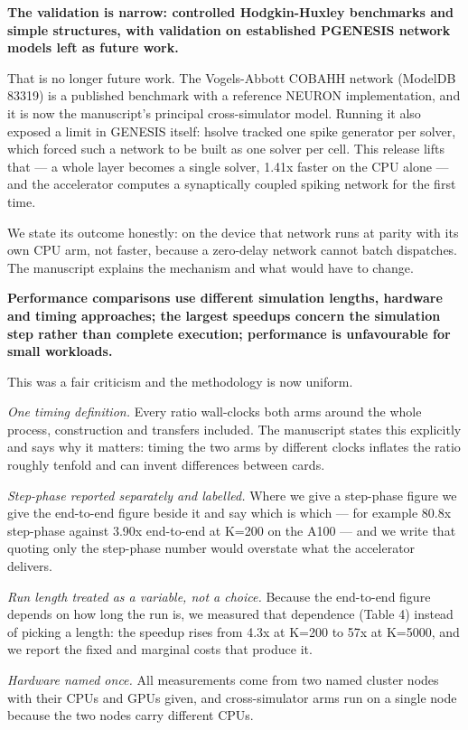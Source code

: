 \documentclass[11pt,a4paper]{article}
\begin{document}
\textbf{The validation is narrow: controlled Hodgkin-Huxley benchmarks and simple structures, with validation on established PGENESIS network models left as future work.}

That is no longer future work. The Vogels-Abbott COBAHH network (ModelDB 83319) is a published benchmark with a reference NEURON implementation, and it is now the manuscript's principal cross-simulator model. Running it also exposed a limit in GENESIS itself: hsolve tracked one spike generator per solver, which forced such a network to be built as one solver per cell. This release lifts that --- a whole layer becomes a single solver, 1.41x faster on the CPU alone --- and the accelerator computes a synaptically coupled spiking network for the first time.

We state its outcome honestly: on the device that network runs at parity with its own CPU arm, not faster, because a zero-delay network cannot batch dispatches. The manuscript explains the mechanism and what would have to change.

\textbf{Performance comparisons use different simulation lengths, hardware and timing approaches; the largest speedups concern the simulation step rather than complete execution; performance is unfavourable for small workloads.}

This was a fair criticism and the methodology is now uniform.

\emph{One timing definition.} Every ratio wall-clocks both arms around the whole process, construction and transfers included. The manuscript states this explicitly and says why it matters: timing the two arms by different clocks inflates the ratio roughly tenfold and can invent differences between cards.

\emph{Step-phase reported separately and labelled.} Where we give a step-phase figure we give the end-to-end figure beside it and say which is which --- for example 80.8x step-phase against 3.90x end-to-end at K=200 on the A100 --- and we write that quoting only the step-phase number would overstate what the accelerator delivers.

\emph{Run length treated as a variable, not a choice.} Because the end-to-end figure depends on how long the run is, we measured that dependence (Table 4) instead of picking a length: the speedup rises from 4.3x at K=200 to 57x at K=5000, and we report the fixed and marginal costs that produce it.

\emph{Hardware named once.} All measurements come from two named cluster nodes with their CPUs and GPUs given, and cross-simulator arms run on a single node because the two nodes carry different CPUs.
\end{document}
